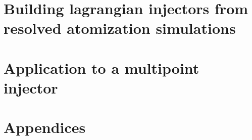 \documentclass[twoside]{report}
\begin{document}

\newpage





\part{Building lagrangian injectors from resolved atomization simulations}

\newpage 

%
%
%

\newpage

\part{Application to a multipoint injector}

\newpage 

%
\newpage
%
%


\newpage
%


%
%


\fancyhead[LO]{}
\nocite{*}


\newpage


\part{Appendices}
\begin{appendices}

\newpage
\newpage

\newpage

\newpage
\end{appendices}
\end{document}
